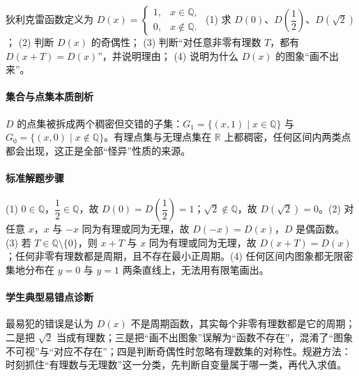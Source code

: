 \begin{problem}
狄利克雷函数定义为 $D(x)=\begin{cases}1,&x\in\mathbb{Q},\\0,&x\notin\mathbb{Q}.\end{cases}$
(1) 求 $D(0)$、$D\left(\dfrac12\right)$、$D(\sqrt2)$；
(2) 判断 $D(x)$ 的奇偶性；
(3) 判断“对任意非零有理数 $T$，都有 $D(x+T)=D(x)$”，并说明理由；
(4) 说明为什么 $D(x)$ 的图象“画不出来”。
\end{problem}
\begin{solution}
\paragraph{集合与点集本质剖析}
$D$ 的点集被拆成两个稠密但交错的子集：$G_1=\{(x,1)\mid x\in\mathbb{Q}\}$ 与 $G_0=\{(x,0)\mid x\notin\mathbb{Q}\}$。有理点集与无理点集在 $\mathbb{R}$ 上都稠密，任何区间内两类点都会出现，这正是全部“怪异”性质的来源。
\paragraph{标准解题步骤}
(1) $0\in\mathbb{Q}$，$\dfrac12\in\mathbb{Q}$，故 $D(0)=D\left(\dfrac12\right)=1$；$\sqrt2\notin\mathbb{Q}$，故 $D(\sqrt2)=0$。(2) 对任意 $x$，$x$ 与 $-x$ 同为有理或同为无理，故 $D(-x)=D(x)$，$D$ 是偶函数。(3) 若 $T\in\mathbb{Q}\setminus\{0\}$，则 $x+T$ 与 $x$ 同为有理或同为无理，故 $D(x+T)=D(x)$；任何非零有理数都是周期，且不存在最小正周期。(4) 任何区间内图象都无限密集地分布在 $y=0$ 与 $y=1$ 两条直线上，无法用有限笔画出。
\paragraph{学生典型易错点诊断}
最易犯的错误是认为 $D(x)$ 不是周期函数，其实每个非零有理数都是它的周期；二是把 $\sqrt2$ 当成有理数；三是把“画不出图象”误解为“函数不存在”，混淆了“图象不可视”与“对应不存在”；四是判断奇偶性时忽略有理数集的对称性。规避方法：时刻抓住“有理数与无理数”这一分类，先判断自变量属于哪一类，再代入求值。
\end{solution}


